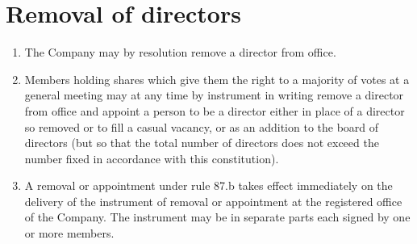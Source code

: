 \section{Removal of directors}

\begin{enumerate}[label=(\alph*)]
    \item The Company may by resolution remove a director from office.
    
    \item Members holding shares which give them the right to a majority of votes at a general meeting may at any time by instrument in writing remove a director from office and appoint a person to be a director either in place of a director so removed or to fill a casual vacancy, or as an addition to the board of directors (but so that the total number of directors does not exceed the number fixed in accordance with this constitution).
    
    \item A removal or appointment under rule 87.b takes effect immediately on the delivery of the instrument of removal or appointment at the registered office of the Company. The instrument may be in separate parts each signed by one or more members.
\end{enumerate} 
